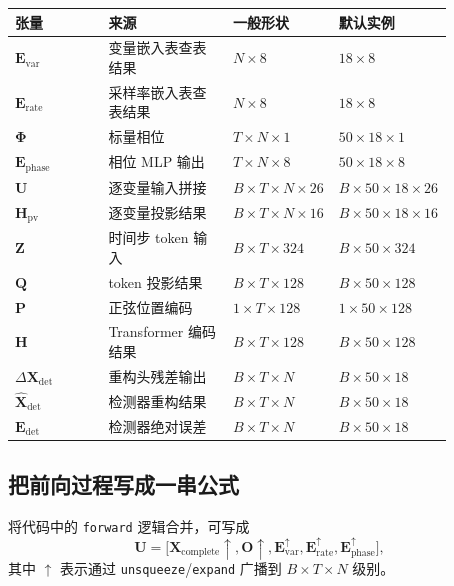 \documentclass[UTF8]{ctexart}
\begin{document}
{\small
\setlength{\tabcolsep}{4pt}
\begin{longtable}{@{}>{\raggedright\arraybackslash}p{0.21\linewidth} >{\raggedright\arraybackslash}p{0.28\linewidth} >{\raggedright\arraybackslash}p{0.17\linewidth} >{\raggedright\arraybackslash}p{0.21\linewidth}@{}}
\toprule
张量 & 来源 & 一般形状 & 默认实例 \\
\midrule
\endhead
\(\bm{E}_{\text{var}}\) & 变量嵌入表查表结果 & \(N\times 8\) & \(18\times 8\) \\
\(\bm{E}_{\text{rate}}\) & 采样率嵌入表查表结果 & \(N\times 8\) & \(18\times 8\) \\
\(\bm{\Phi}\) & 标量相位 & \(T\times N\times 1\) & \(50\times 18\times 1\) \\
\(\bm{E}_{\text{phase}}\) & 相位 MLP 输出 & \(T\times N\times 8\) & \(50\times 18\times 8\) \\
\(\bm{U}\) & 逐变量输入拼接 & \(B\times T\times N\times 26\) & \(B\times 50\times 18\times 26\) \\
\(\bm{H}_{\text{pv}}\) & 逐变量投影结果 & \(B\times T\times N\times 16\) & \(B\times 50\times 18\times 16\) \\
\(\bm{Z}\) & 时间步 token 输入 & \(B\times T\times 324\) & \(B\times 50\times 324\) \\
\(\bm{Q}\) & token 投影结果 & \(B\times T\times 128\) & \(B\times 50\times 128\) \\
\(\bm{P}\) & 正弦位置编码 & \(1\times T\times 128\) & \(1\times 50\times 128\) \\
\(\bm{H}\) & Transformer 编码结果 & \(B\times T\times 128\) & \(B\times 50\times 128\) \\
\(\Delta\bm{X}_{\text{det}}\) & 重构头残差输出 & \(B\times T\times N\) & \(B\times 50\times 18\) \\
\(\widehat{\bm{X}}_{\text{det}}\) & 检测器重构结果 & \(B\times T\times N\) & \(B\times 50\times 18\) \\
\(\bm{E}_{\text{det}}\) & 检测器绝对误差 & \(B\times T\times N\) & \(B\times 50\times 18\) \\
\bottomrule
\end{longtable}
}

\subsection{把前向过程写成一串公式}

将代码中的 \texttt{forward} 逻辑合并，可写成
\begin{equation}
    \bm{U}
    =
    \Big[
        \bm{X}_{\text{complete}} \uparrow,
        \bm{O} \uparrow,
        \bm{E}_{\text{var}}^{\uparrow},
        \bm{E}_{\text{rate}}^{\uparrow},
        \bm{E}_{\text{phase}}^{\uparrow}
    \Big],
\end{equation}
其中 \(\uparrow\) 表示通过 \texttt{unsqueeze}/\texttt{expand} 广播到 \(B\times T\times N\) 级别。
\end{document}
